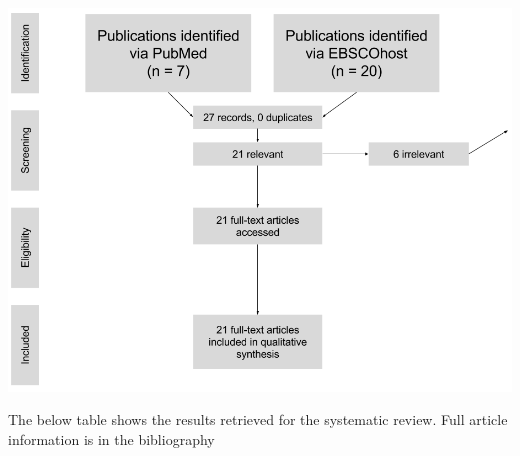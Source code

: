 \documentclass[]{elsarticle} %
\begin{document}
\begin{center}
\includegraphics[width=400pt]{img/prisma.png}
\end{center}

The below table shows the results retrieved for the systematic review.
Full article information is in the bibliography

\begingroup\fontsize{6pt}{7pt}\selectfont
\end{document}
